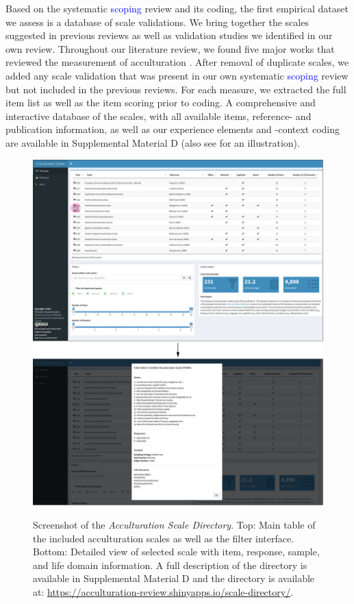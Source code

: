 Based on the systematic \textcolor{blue}{scoping} review and its coding,
the first empirical dataset we assess is a database of scale
validations. We bring together the scales suggested in previous reviews
as well as validation studies we identified in our own review.
Throughout our literature review, we found five major works that
reviewed the measurement of acculturation
\citep{Celenk2011, Maestas2000, Matsudaira2006, Wallace2010, Zane2004}.
After removal of duplicate scales, we added any scale validation that
was present in our own systematic \textcolor{blue}{scoping} review but
not included in the previous reviews. For each measure, we extracted the
full item list as well as the item scoring prior to coding. A
comprehensive and interactive database of the scales, with all available
items, reference- and publication information, as well as our experience
elements and -context coding are available in Supplemental Material D
(also see  for an illustration).

\begin{figure}[ht!]
  \centering
  \caption{Screenshot of the \textit{Acculturation Scale Directory}. Top: Main table of the included acculturation scales as well as the filter interface. Bottom: Detailed view of selected scale with item, response, sample, and life domain information. A full description of the directory is available in Supplemental Material D and the directory is available at: \href{https://acculturation-review.shinyapps.io/scale-directory/}{https://acculturation-review.shinyapps.io/scale-directory/}.}
  \includegraphics[width=\textwidth]{Figures/AcculturationDIrectoryScreenshot.pdf}
  \label{fig:DirectoryScreen}
\end{figure}


